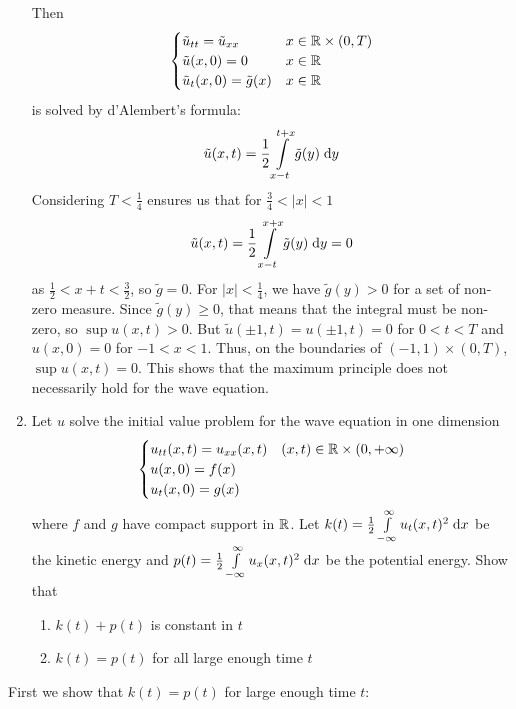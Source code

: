 \begin{enumerate}
  Then
  $$
  \begin{cases}
    \tilde{u}_{tt} = \tilde{u}_{xx} & x \in \mathbb{R} \times (0, T)\\
    \tilde{u}(x, 0) = 0 & x \in \mathbb{R}\\
    \tilde{u}_t(x, 0) = \tilde{g}(x) & x \in \mathbb{R}\\
  \end{cases}
  $$
  is solved by d'Alembert's formula:
  $$
  \tilde{u}(x, t) = \frac{1}{2} \int \limits_{x - t}^{t + x} \tilde{g}(y) \;\mathrm{d}y
  $$
  Considering $T < \frac{1}{4}$ ensures us that for $\frac{3}{4} < |x| < 1$
  $$
  \tilde{u}(x, t) = \frac{1}{2} \int \limits_{x - t}^{x + x} \tilde{g}(y) \;\mathrm{d}y = 0
  $$
  as $\frac{1}{2} < x + t < \frac{3}{2}$, so $\tilde{g} = 0$.
  For $|x| < \frac{1}{4}$, we have $\tilde{g}(y) > 0$ for a set of non-zero measure.
  Since $\tilde{g}(y) \geq 0$, that means that the integral must be non-zero, so $\sup u(x, t) > 0$.
  But $\tilde{u}(\pm 1, t) = u(\pm 1, t) = 0$ for $0 < t < T$ and $u(x, 0) = 0$ for $-1 < x < 1$.
  Thus, on the boundaries of $(-1, 1) \times (0, T)$, $\sup u(x, t) = 0$.
  This shows that the maximum principle does not necessarily hold for the wave equation.

\item
  Let $u$ solve the initial value problem for the wave equation in one dimension
  $$
  \begin{cases}
    u_{tt}(x, t) = u_{xx}(x, t) & (x, t) \in \mathbb{R} \times (0, +\infty)\\
    u(x, 0) = f(x)\\
    u_t(x, 0) = g(x)
  \end{cases}
  $$
  where $f$ and $g$ have compact support in $\mathbb{R}$.
  Let $k(t) = \frac{1}{2} \int \limits_{-\infty}^{\infty} u_t(x, t)^2 \;\mathrm{d}x$ be the kinetic energy
  and $p(t) = \frac{1}{2} \int \limits_{-\infty}^{\infty} u_x(x, t)^2 \;\mathrm{d}x$ be the potential energy.
  Show that
  \begin{enumerate}
  \item
    $k(t) + p(t)$ is constant in $t$
  \item
    $k(t) = p(t)$ for all large enough time $t$
  \end{enumerate}
\end{enumerate}

First we show that $k(t) = p(t)$ for large enough time $t$:

